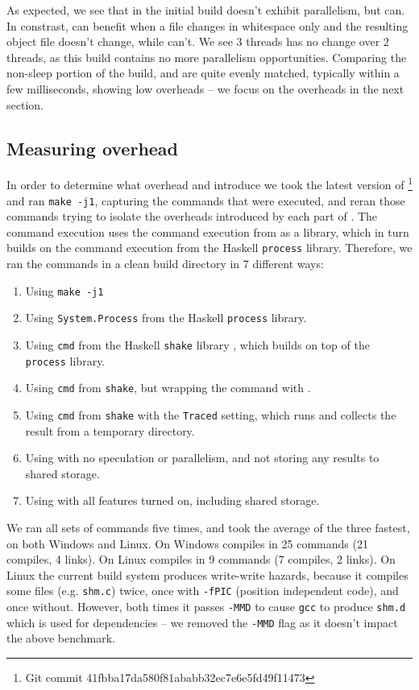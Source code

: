 As expected, we see that in the initial build \Rattle doesn't exhibit parallelism, but \Make can. In constrast, \Rattle can benefit when a file changes in whitespace only and the resulting object file doesn't change, while \Make can't. We see 3 threads has no change over 2 threads, as this build contains no more parallelism opportunities. Comparing the non-sleep portion of the build, \Make and \Rattle are quite evenly matched, typically within a few milliseconds, showing low overheads -- we focus on the overheads in the next section.

\subsection{Measuring overhead}
\label{sec:eval:overhead}

In order to determine what overhead \Rattle and \Fsatrace introduce we took the latest version of \Fsatrace\footnote{Git commit 41fbba17da580f81ababb32ec7e6e5fd49f11473} and ran \texttt{make -j1}, capturing the commands that were executed, and reran those commands trying to isolate the overheads introduced by each part of \Rattle. The \Rattle command execution uses the command execution from \Shake \cite{shake} as a library, which in turn builds on the command execution from the Haskell \texttt{process} library. Therefore, we ran the commands in a clean build directory in 7 different ways:

\begin{enumerate}
\item Using \texttt{make -j1}
\item Using \texttt{System.Process} from the Haskell \texttt{process} library.
\item Using \texttt{cmd} from the Haskell \texttt{shake} library \cite{shake}, which builds on top of the \texttt{process} library.
\item Using \texttt{cmd} from \texttt{shake}, but wrapping the command with \Fsatrace.
\item Using \texttt{cmd} from \texttt{shake} with the \texttt{Traced} setting, which runs \Fsatrace and collects the result from a temporary directory.
\item Using \Rattle with no speculation or parallelism, and not storing any results to shared storage.
\item Using \Rattle with all features turned on, including shared storage.
\end{enumerate}

We ran all sets of commands five times, and took the average of the three fastest, on both Windows and Linux. On Windows \Fsatrace compiles in 25 commands (21 compiles, 4 links). On Linux \Fsatrace compiles in 9 commands (7 compiles, 2 links). On Linux the current build system produces write-write hazards, because it compiles some files (e.g. \texttt{shm.c}) twice, once with \texttt{-fPIC} (position independent code), and once without. However, both times it passes \texttt{-MMD} to cause \texttt{gcc} to produce \texttt{shm.d} which is used for dependencies -- we removed the \texttt{-MMD} flag as it doesn't impact the above benchmark.

